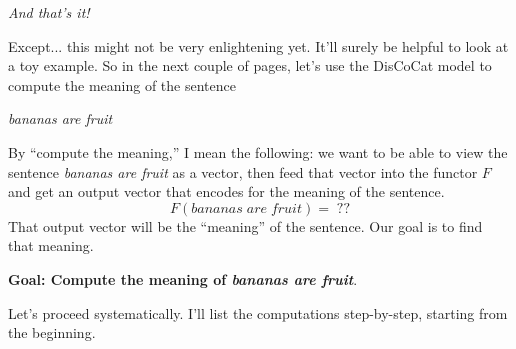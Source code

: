 \documentclass{tufte-handout-tai}
\theoremstyle{plain}
\theoremstyle{definition}
\theoremstyle{remark}
\begin{document}
\vspace{0.4cm}
\noindent \textit{And that's it!}
\vspace{0.4cm}


Except... this might not be very enlightening yet. It'll surely be helpful to look at a toy example. So in the next couple of pages, let's use the DisCoCat model to compute the meaning of the sentence

\begin{center}
\textit{\large bananas are fruit}
\end{center}

\noindent By ``compute the meaning,'' I mean the following: we want to be able to view the sentence \textit{bananas are fruit} as a vector, then feed that vector into the functor $F$ and get an output vector that encodes for the meaning of the sentence. \[F(bananas\;are\;fruit)=\;??\] That output vector will be the ``meaning'' of the sentence. Our goal is to find that meaning.

\vspace{0.4cm}
\begin{center}
\noindent\textbf{\large Goal: Compute the meaning of \textit{bananas are fruit}}.
\end{center}



Let's proceed systematically.  I'll list the computations step-by-step, starting from the beginning.
	
\end{document}
